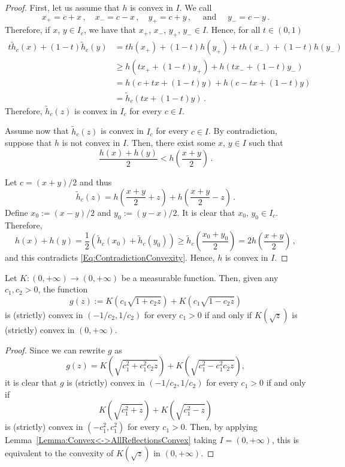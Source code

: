 \begin{proof}
First, let us assume that $h$ is convex in $I$. We call
$$
x_+ = c + x\,, \quad x_- = c - x\,, \quad y_+ = c + y\,, \quad \textrm{ and } \quad y_- = c - y\,.
$$
Therefore, if $x$, $y\in I_c$, we have that $x_+$, $x_-$, $y_+$, $y_- \in I$. Hence, for all $t\in
(0,1)$
\begin{align*}
t\widetilde{h}_c(x) + (1-t)\widetilde{h}_c(y)
&=  th(x_+) + (1-t)h(y_+) + t h(x_-) + (1-t)h(y_-) \\
&\geq h(tx_+ + (1-t)y_+) + h(tx_- + (1-t)y_-) \\
&= h(c + tx + (1-t)y) + h(c-tx + (1-t)y) \\
& = \widetilde{h}_c(tx + (1-t)y)\,.
\end{align*}
Therefore, $\widetilde{h}_c(z)$ is convex in $I_c$ for every $c\in I$.

Assume now that $\widetilde{h}_c(z)$ is convex in $I_c$ for every $c\in I$. By contradiction,
suppose that $h$ is not convex in $I$. Then, there exist some $x$, $y\in I$ such that
\begin{equation}
\label{Eq:ContradictionConvexity}
\dfrac{h(x) + h(y)}{2} < h \left (\dfrac{x+y}{2}\right )\,.
\end{equation}

Let $c = (x+y)/2$ and thus
$$
\widetilde{h}_c(z) = h\left( \dfrac{x+y}{2} + z\right) +  h\left( \dfrac{x+y}{2} - z\right)\,.
$$
Define $ x_0 := (x-y)/2$ and $y_0:= (y-x)/2$. It is clear that $x_0$, $y_0\in I_c$. Therefore,
$$
h(x) + h(y) = \dfrac{1}{2} \left( \widetilde{h}_c(x_0) + \widetilde{h}_c(y_0)\right )
\geq \widetilde{h}_c \left( \dfrac{x_0 + y_0}{2}\right )
= 2 h \left (\dfrac{x+y}{2}\right )\,,
$$
and this contradicts \eqref{Eq:ContradictionConvexity}. Hence, $h$ is convex in $I$.
\end{proof}


\begin{corollary}
\label{Cor:gConvex<->K(sqrt)convex} Let $K:(0,+\infty) \to (0,+\infty)$ be a measurable function.
Then, given any $c_1,c_2>0$, the function
$$
g(z) := K \left (c_1 \sqrt{1 + c_2 z}\right) +  K \left (c_1 \sqrt{1 - c_2 z}\right)
$$
is  (strictly) convex in $(-1/c_2, 1/c_2)$ for every $c_1>0$ if and only if $K(\sqrt{z})$ is
(strictly) convex in $(0, +\infty)$.
\end{corollary}
\begin{proof}
Since we can rewrite $g$ as
$$
g(z) = K \left (\sqrt{c_1^2 + c_1^2c_2 z}\right) +  K \left (\sqrt{c_1^2 - c_1^2c_2 z}\right),
$$
it is clear that $g$ is  (strictly) convex in $(-1/c_2, 1/c_2)$ for every $c_1>0$ if and only if
$$
K \left(\sqrt{c_1^2 + z}\right) +  K \left(\sqrt{c_1^2 - z}\right)
$$
is (strictly) convex in $(-c_1^2, c_1^2)$ for every $c_1>0$. Then, by applying
Lemma~\ref{Lemma:Convex<->AllReflectionsConvex} taking $I = (0,+\infty)$, this is equivalent to the
convexity of $K(\sqrt{z})$ in $(0, +\infty)$.
\end{proof}

